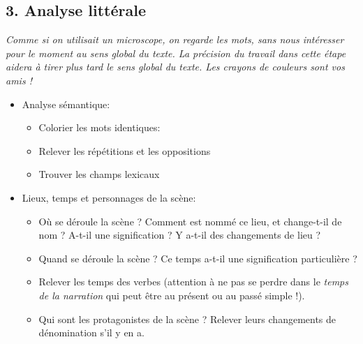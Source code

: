 \subsection*{3. Analyse littérale}
\textit{Comme si on utilisait un microscope, on regarde les mots, sans nous intéresser pour le moment au sens global du texte. La précision du travail dans cette étape aidera à tirer plus tard le sens global du texte. Les crayons de couleurs sont vos amis !}
\begin{itemize}[label=]
    \item Analyse sémantique:
          \begin{itemize}[label=]
              \item Colorier les mots identiques:
              \item Relever les répétitions et les oppositions
              \item Trouver les champs lexicaux
          \end{itemize}
    \item Lieux, temps et personnages de la scène:
          \begin{itemize}[label=]
              \item Où se déroule la scène ? Comment est nommé ce lieu, et change-t-il de nom ? A-t-il une signification ? Y a-t-il des changements de lieu ?
              \item Quand se déroule la scène ? Ce temps a-t-il une signification particulière ?
              \item Relever les temps des verbes (attention à ne pas se perdre dans le \textit{temps de la narration} qui peut être au présent ou au passé simple !).
              \item Qui sont les protagonistes de la scène ? Relever leurs changements de dénomination s'il y en a.
          \end{itemize}
\end{itemize}
\newpage

